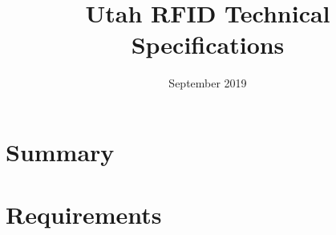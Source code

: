 \documentclass{article}
\title{Utah RFID Technical Specifications}
\author{}
\date{September 2019}
\begin{document}
\maketitle

\section{Summary}

\section{Requirements}
\end{document}
